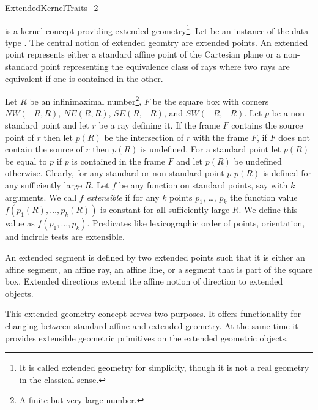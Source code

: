 
\begin{ccRefConcept}{ExtendedKernelTraits_2}

\ccDefinition

 is a kernel concept providing extended
geometry\footnote{It is called extended geometry for simplicity,
though it is not a real geometry in the classical sense.}. Let 
be an instance of the data type .  The
central notion of extended geomtry are extended points. An extended
point represents either a standard affine point of the Cartesian plane
or a non-standard point representing the equivalence class of rays
where two rays are equivalent if one is contained in the other.

Let $R$ be an infinimaximal number\footnote{A finite but very large
number.}, $F$ be the square box with corners $NW(-R,R)$, $NE(R,R)$,
$SE(R,-R)$, and $SW(-R,-R)$. Let $p$ be a non-standard point and let
$r$ be a ray defining it. If the frame $F$ contains the source point
of $r$ then let $p(R)$ be the intersection of $r$ with the frame $F$,
if $F$ does not contain the source of $r$ then $p(R)$ is undefined.
For a standard point let $p(R)$ be equal to $p$ if $p$ is contained in
the frame $F$ and let $p(R)$ be undefined otherwise. Clearly, for any
standard or non-standard point $p$ $p(R)$ is defined for any
sufficiently large $R$. Let $f$ be any function on standard points,
say with $k$ arguments. We call $f$ {\em extensible} if for any $k$
points $p_1$, \ldots, $p_k$ the function value
$f(p_1(R),\ldots,p_k(R))$ is constant for all sufficiently large
$R$. We define this value as $f(p_1,\ldots,p_k)$.  Predicates like
lexicographic order of points, orientation, and incircle tests are
extensible.

An extended segment is defined by two extended points such that it
is either an affine segment, an affine ray, an affine line, or a
segment that is part of the square box. Extended directions extend
the affine notion of direction to extended objects.

This extended geometry concept serves two purposes. It offers
functionality for changing between standard affine and extended
geometry. At the same time it provides extensible geometric primitives
on the extended geometric objects. 

\ccSetOneOfTwoColumns{7cm}

\ccTypes


\end{ccRefConcept}

